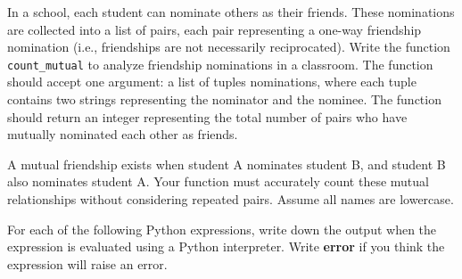 \documentclass[12pt]{exam}
\begin{document}
\begin{questions}
\question In a school, each student can nominate others as their friends. These nominations are collected into a
list of pairs, each pair representing a one-way friendship nomination (i.e., friendships are not necessarily
reciprocated). Write the function \verb|count_mutual| to analyze friendship nominations in a classroom. The
function should accept one argument: a list of tuples nominations, where each tuple contains two strings
representing the nominator and the nominee. The function should return an integer representing the total
number of pairs who have mutually nominated each other as friends.

A mutual friendship exists when student A nominates student B, and student B also nominates student A.
Your function must accurately count these mutual relationships without considering repeated pairs. Assume
all names are lowercase.

\color{gray}
\question For each of the following Python expressions, write down the output when the expression is evaluated using a Python interpreter. Write \textbf{error} if you think the expression will raise an error.

\end{questions}
\end{document}
